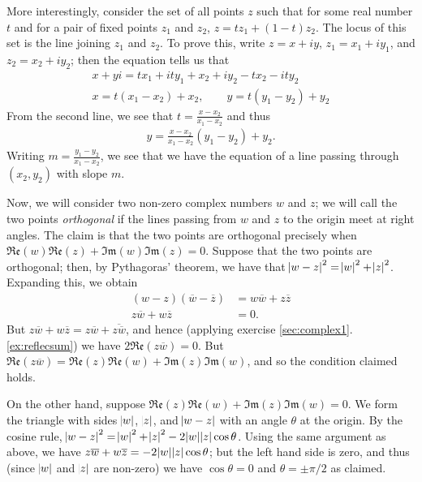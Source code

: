 \documentclass[a4paper,10pt,titlepage]{article}
\theoremstyle{definition}
\newcommand*\realp[1]{ \mathfrak{Re} \left ( {#1} \right )  }
\newcommand*\imagp[1]{ \mathfrak{Im} \left ( {#1} \right )  }
\begin{document}
More interestingly, consider the set of all points $ z $ such that for some real number $ t $ and for a pair of fixed
points $ z_1 $ and $ z_2 $, $ z = tz_1 + (1 - t)z_2 $. The locus of this set is the line joining $ z_1 $ and $ z_2 $.
To prove this, write $ z = x + iy $, $ z_1 = x_1 + iy_1 $, and $ z_2 = x_2 + iy_2 $; then the equation tells us that
\begin{gather*}
  x + yi = tx_1 + it y_1 + x_2 + i y_2 - tx_2 - it y_2\\
  x = t(x_1 - x_2) + x_2, \qquad y = t(y_1 - y_2) + y_2
\end{gather*}
From the second line, we see that $ t = \frac{x - x_2}{x_1 - x_2} $ and thus
\begin{gather*}
  y = \frac{x - x_2}{x_1 - x_2}(y_1 - y_2) + y_2.
\end{gather*}
Writing $ m = \frac{y_1 - y_2}{x_1 - x_2} $, we see that we have the equation of a line passing through $ (x_2, y_2) $
with slope $ m $.

Now, we will consider two non-zero complex numbers $ w $ and $ z $; we will call the two points \textit{orthogonal} if the lines
passing from $ w $ and $ z $ to the origin meet at right angles. The claim is that the two points are orthogonal precisely
when $ \realp w \realp z + \imagp w \imagp z = 0 $. Suppose that the two points are orthogonal; then, by Pythagoras' theorem,
we have that $ \abs{w - z}^2 = \abs{w}^2 + \abs{z}^2 $. Expanding this, we obtain
\begin{align*}
  (w - z)(\overline{w} - \overline{z}) &= w\overline{w} + z\overline{z}\\
  z\overline{w} + w\overline{z} &= 0.
\end{align*}
But $ z\overline{w} + w\overline{z} = z \overline{w} + \overline{z \overline{w}} $, and hence (applying exercise \ref{sec:complex1}.\ref{ex:reflecsum})
we have $ 2 \realp{z \overline{w}} = 0 $. But $ \realp{z \overline w} = \realp{z}\realp{w} + \imagp{z} \imagp{w} $, and so the condition
claimed holds.

On the other hand, suppose $ \realp{z}\realp{w} + \imagp{z} \imagp{w} = 0 $. We form the triangle with sides $ \abs{w} $, $ \abs{z} $,
and $ \abs{w - z} $ with an angle $ \theta $ at the origin. By the cosine rule, $ \abs{w - z}^2 = \abs{w}^2 + \abs{z}^2 - 2\abs{w}\abs{z}\cos\theta $.
Using the same argument as above, we have $ z\overline{w} + w\overline{z} = - 2\abs{w}\abs{z}\cos\theta $; but the left hand side
is zero, and thus (since $ \abs{w} $ and $ \abs{z} $ are non-zero) we have $ \cos \theta = 0 $ and $ \theta = \pm \pi/2 $ as claimed.
\end{document}
